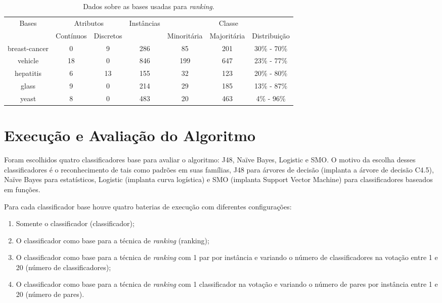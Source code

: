 \begin{table}[h]

    \begin{tabular}{c c c c c c c}
        \hline
        \multirow{2}{*}{Bases} & \multicolumn{2}{c}{Atributos} & \multirow{2}{*}{Instâncias} & \multicolumn{3}{c}{Classe} \\ \cline{2-3} \cline{5-7}
        & {\small Contínuos} & {\small Discretos} & & {\small Minoritária} & {\small Majoritária} & {\small Distribuição}\\
        \hline
        breast-cancer & 0 & 9 & 286 & 85 & 201 & 30\% - 70\%\\
        vehicle & 18 & 0  & 846 & 199 & 647 & 23\% - 77\%\\
        hepatitis & 6 & 13  & 155 & 32 & 123 & 20\% - 80\%\\
        glass & 9 & 0  & 214 & 29 & 185 & 13\% - 87\%\\
        yeast & 8 & 0  & 483 & 20 & 463 & 4\% - 96\%\\
        \hline
    \end{tabular}

    \caption{Dados sobre as bases usadas para \emph{ranking}. \label{tbl:caracteristicas}}
\end{table}

\section{Execução e Avaliação do Algoritmo}
\label{sec:avaliacao}

Foram escolhidos quatro classificadores base para avaliar o algoritmo: J48, Naïve Bayes, Logistic e SMO. O motivo da escolha desses classificadores é o reconhecimento de tais como padrões em suas famílias, J48 para árvores de decisão (implanta a árvore de decisão C4.5), Naïve Bayes para estatísticos, Logistic (implanta curva logística) e SMO (implanta Support Vector Machine) para classificadores baseados em funções.

Para cada classificador base houve quatro baterias de execução com diferentes configurações:

\begin{enumerate}
    \item Somente o classificador (classificador);
    \item O classificador como base para a técnica de \emph{ranking} (ranking);
    \item O classificador como base para a técnica de \emph{ranking} com 1 par por instância e variando o número de classificadores na votação entre 1 e 20 (número de classificadores);
    \item O classificador como base para a técnica de \emph{ranking} com 1 classificador na votação e variando o número de pares por instância entre 1 e 20 (número de pares).
\end{enumerate}

